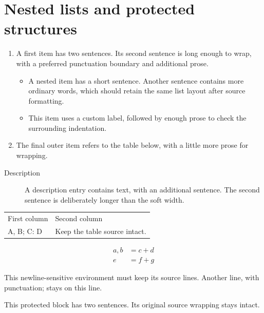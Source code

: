 \documentclass{article}
\newenvironment{linewise}{\par\begingroup\obeylines}{\endgroup\par}
\begin{document}
\section{Nested lists and protected structures}
\begin{enumerate}
\item A first item has two sentences. Its second sentence is long enough to wrap, with a preferred punctuation boundary and additional prose.
\begin{itemize}
\item A nested item has a short sentence. Another sentence contains more ordinary words, which should retain the same list layout after source formatting.
\item[Custom label] This item uses a custom label, followed by enough prose to check the surrounding indentation.
\end{itemize}
\item The final outer item refers to the table below, with a little more prose for wrapping.
\end{enumerate}

\begin{description}
\item[Description] A description entry contains text, with an additional sentence. The second sentence is deliberately longer than the soft width.
\end{description}

\begin{tabular}{ll}
  First column & Second column \\
  A, B; C: D   & Keep the table source intact. \\
\end{tabular}

\begin{align*}
  a, b &= c + d \\
  e &= f + g
\end{align*}

\begin{linewise}
This newline-sensitive environment must keep its source lines.
Another line, with punctuation; stays on this line.
\end{linewise}

This protected block has two sentences. Its original source wrapping stays intact.
\end{document}

